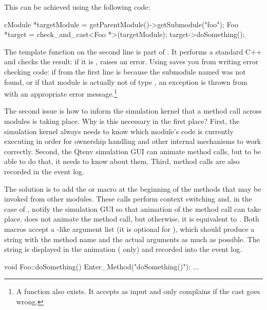 This can be achieved using the following code:

\begin{cpp}
cModule *targetModule = getParentModule()->getSubmodule("foo");
Foo *target = check_and_cast<Foo *>(targetModule);
target->doSomething();
\end{cpp}

The  template function on the second line
is part of {\opp}. It performs a standard C++  and checks
the result: if it is ,  raises an {\opp} error.
Using  saves you from writing error checking code:
if  from the first line is  because
the submodule named  was not found, or if that
module is actually not of type , an exception is thrown
from  with an appropriate error message.\footnote{A
 function also exists. It
accepts  as input and only complains if the cast goes wrong.}

The second issue is how to inform the simulation kernel that
a method call across modules is taking place. Why is this necessary
in the first place? First, the simulation kernel always needs to know which
module's code is currently executing in order for ownership handling
and other internal mechanisms to work correctly. Second, the Qtenv
simulation GUI can animate method calls, but to be able to do that,
it needs to know about them. Third, method calls are also recorded
in the event log.

The solution is to add the  or 
macro at the beginning of the methods that may be invoked from other
modules. These calls perform context switching and, in the case of
, notify the simulation GUI so that animation
of the method call can take place. 
does not animate the method call, but otherwise, it is equivalent
to . Both macros accept a -like
argument list (it is optional for ),
which should produce a string with the method name and the
actual arguments as much as possible. The string is displayed in
the animation ( only) and recorded into the event log.


\begin{cpp}
void Foo::doSomething()
{
    Enter_Method("doSomething()");
    ...
}
\end{cpp}



